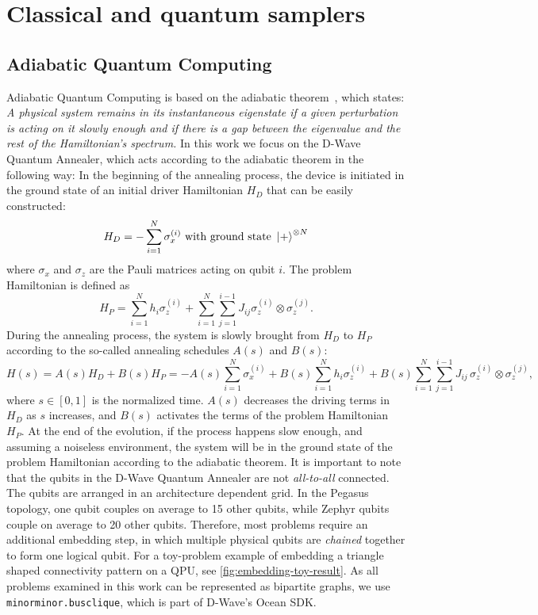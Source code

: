 \documentclass[10pt,a4paper]{article}
\numberwithin{equation}{section}
\begin{document}
\section{Classical and quantum samplers}
\subsection{Adiabatic Quantum Computing}
\label{sec:solvers:quantum:adiab}
 Adiabatic Quantum Computing is based on the adiabatic theorem~\cite{Born_Fock_1928,Farhi_2000}, which states: \textit{A physical system remains in its instantaneous eigenstate if a given perturbation is acting on it slowly enough and if there is a gap between the eigenvalue and the rest of the Hamiltonian's spectrum.}
In this work we focus on the D-Wave Quantum Annealer, which acts according to the adiabatic theorem in the following way: 
In the beginning of the annealing process, the device is initiated in the ground state of an initial driver Hamiltonian $H_D$ that can be easily constructed:
\begin{equation}
H_D=-\sum_{i=1}^N \sigma_x^{(i)} \text{ with ground state } \ket{+}^{\otimes N}
\end{equation}
where $\sigma_x$ and $\sigma_z$ are the Pauli matrices acting on qubit $i$. The problem Hamiltonian is defined as
\begin{equation}
H_P=\sum_{i=1}^N h_i\sigma_z^{(i)}+\sum_{i=1}^N\sum_{j=1}^{i-1} J_{ij}\sigma_z^{(i)}\otimes\sigma_z^{(j)}.
\end{equation}
During the annealing process, the system is slowly brought from $H_D$ to $H_P$
according to the so-called annealing schedules $A(s)$ and $B(s)$:
\begin{equation}
H(s) = A(s)H_D + B(s)H_P
= -A(s)\sum_{i=1}^{N} \sigma_x^{(i)}
+ B(s)\sum_{i=1}^{N} h_i \sigma_z^{(i)}
+ B(s)\sum_{i=1}^{N}\sum_{j=1}^{i-1} J_{ij}\, \sigma_z^{(i)} \otimes \sigma_z^{(j)},
\label{eq:annealing_hamiltonian}
\end{equation}
where $s \in [0,1]$ is the normalized time. $A(s)$ decreases the driving terms in $H_D$ as $s$ increases,
and $B(s)$ activates the terms of the problem Hamiltonian $H_P$. At the end of the evolution, if the process happens slow enough, and assuming a noiseless environment, the system will be in the ground state of the problem Hamiltonian according to the adiabatic theorem.
It is important to note that the qubits in the D-Wave Quantum Annealer are not \textit{all-to-all} connected. The qubits are arranged in an architecture dependent grid. In the Pegasus topology, one qubit couples on average to 15 other qubits, while Zephyr qubits couple on average to 20 other qubits. Therefore, most problems require an additional embedding step, in which multiple physical qubits are \textit{chained} together to form one logical qubit. For a toy-problem example of embedding a triangle shaped connectivity pattern on a QPU, see \autoref{fig:embedding-toy-result}. As all problems examined in this work can be represented as bipartite graphs, we use \texttt{minorminor.busclique}, which is part of D-Wave's Ocean SDK.
\end{document}
